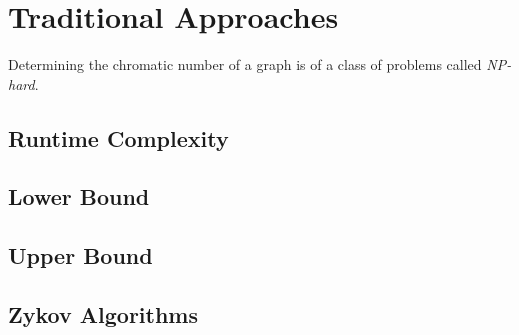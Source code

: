 \section{Traditional Approaches}

Determining the chromatic number of a graph is of a class of problems called \emph{NP-hard}.

\subsection{Runtime Complexity}

\subsection{Lower Bound}

\subsection{Upper Bound}

\subsection{Zykov Algorithms}

